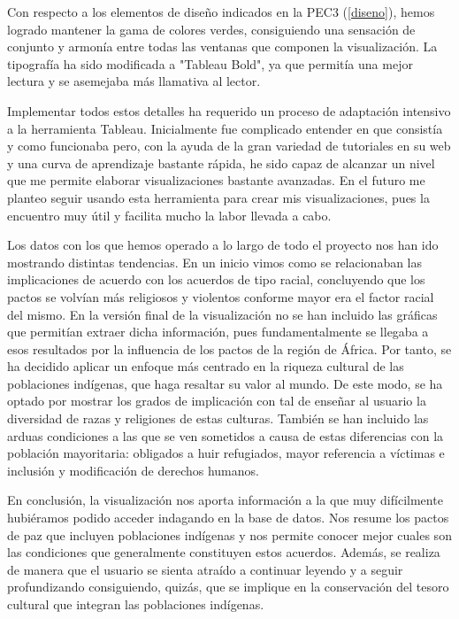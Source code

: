 \documentclass[11pt]{article}
\begin{document}
Con respecto a los elementos de diseño indicados en la PEC3 (\ref{diseno}), hemos logrado mantener la gama de colores verdes, consiguiendo una sensación de conjunto y armonía entre todas las ventanas que componen la visualización.  La tipografía ha sido modificada a "Tableau Bold", ya que permitía una mejor lectura y se asemejaba más llamativa al lector.

Implementar todos estos detalles ha requerido un proceso de adaptación intensivo a la herramienta Tableau. Inicialmente fue complicado entender en que consistía y como funcionaba pero, con la ayuda de la gran variedad de tutoriales en su web y una curva de aprendizaje bastante rápida, he sido capaz de alcanzar un nivel que me permite elaborar visualizaciones bastante avanzadas. En el futuro me planteo seguir usando esta herramienta para crear mis visualizaciones, pues la encuentro muy útil y facilita mucho la labor llevada a cabo.

Los datos con los que hemos operado a lo largo de todo el proyecto nos han ido mostrando distintas tendencias. En un inicio vimos como se relacionaban las implicaciones de acuerdo con los acuerdos de tipo racial, concluyendo que los pactos se volvían más religiosos y violentos conforme mayor era el factor racial del mismo. En la versión final de la visualización no se han incluido las gráficas que permitían extraer dicha información, pues fundamentalmente se llegaba a esos resultados por la influencia de los pactos de la región de África. Por tanto, se ha decidido aplicar un enfoque más centrado en la riqueza cultural de las poblaciones indígenas, que haga resaltar su valor al mundo. De este modo, se ha optado por mostrar los grados de implicación con tal de enseñar al usuario la diversidad de razas y religiones de estas culturas. También se han incluido las arduas condiciones a las que se ven sometidos a causa de estas diferencias con la población mayoritaria: obligados a huir refugiados, mayor referencia a víctimas e inclusión y modificación de derechos humanos.

En conclusión, la visualización nos aporta información a la que muy difícilmente hubiéramos podido acceder indagando en la base de datos. Nos resume los pactos de paz que incluyen poblaciones indígenas y nos permite conocer mejor cuales son las condiciones que generalmente constituyen estos acuerdos. Además, se realiza de manera que el usuario se sienta atraído a continuar leyendo y a seguir profundizando consiguiendo, quizás, que se implique en la conservación del tesoro cultural que integran las poblaciones indígenas.
\end{document}
